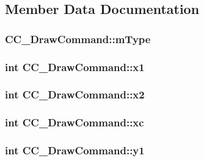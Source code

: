 \subsection{Member Data Documentation}
\hypertarget{a00031_a705d7df69bb8d1d57cf19364bb16c360}{
\subsubsection[{m\-Type}]{ C\-C\-\_\-\-Draw\-Command\-::m\-Type}}\label{a00031_a705d7df69bb8d1d57cf19364bb16c360}
\hypertarget{a00031_ab0765ddbef0f8b2a951b1cbf89749dcb}{
\subsubsection[{x1}]{\setlength{\rightskip}{0pt plus 5cm}int C\-C\-\_\-\-Draw\-Command\-::x1}}\label{a00031_ab0765ddbef0f8b2a951b1cbf89749dcb}
\hypertarget{a00031_a51a3822e9c4987fb24b7c1673f4578a1}{
\subsubsection[{x2}]{\setlength{\rightskip}{0pt plus 5cm}int C\-C\-\_\-\-Draw\-Command\-::x2}}\label{a00031_a51a3822e9c4987fb24b7c1673f4578a1}
\hypertarget{a00031_acb50ef1cef70a72abb115119ca846fb6}{
\subsubsection[{xc}]{\setlength{\rightskip}{0pt plus 5cm}int C\-C\-\_\-\-Draw\-Command\-::xc}}\label{a00031_acb50ef1cef70a72abb115119ca846fb6}
\hypertarget{a00031_a4f1aa57032b716f3dba3c7db7cc1b696}{
\subsubsection[{y1}]{\setlength{\rightskip}{0pt plus 5cm}int C\-C\-\_\-\-Draw\-Command\-::y1}}\label{a00031_a4f1aa57032b716f3dba3c7db7cc1b696}
